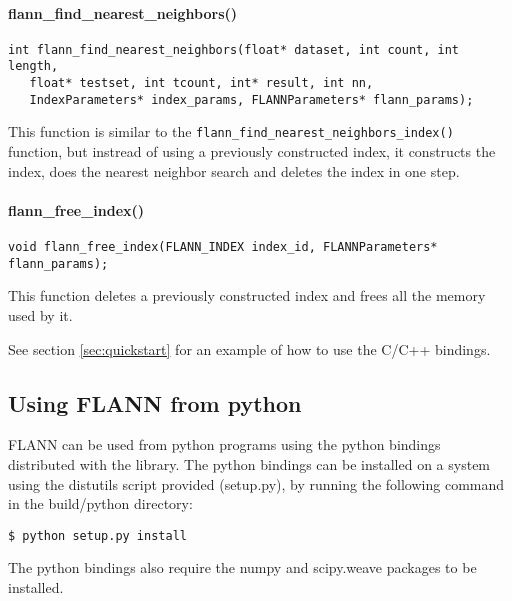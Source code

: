 \documentclass[letter,10pt]{article}
\begin{document}
\paragraph{flann\_find\_nearest\_neighbors()}
\begin{Verbatim}[fontsize=\footnotesize,frame=single]
int flann_find_nearest_neighbors(float* dataset, int count, int length,
   float* testset, int tcount, int* result, int nn, 
   IndexParameters* index_params, FLANNParameters* flann_params);
\end{Verbatim}
This function is similar to the
\texttt{flann\_find\_nearest\_neighbors\_index()} function, but instread of
using a previously constructed index, it constructs the index, does the nearest
neighbor search and deletes the index in one step.




\paragraph{flann\_free\_index()}
\begin{Verbatim}[fontsize=\footnotesize,frame=single]
void flann_free_index(FLANN_INDEX index_id, FLANNParameters* flann_params);
\end{Verbatim}
This function deletes a previously constructed index and frees all the memory
used by it.

\bigskip

See section \ref{sec:quickstart} for an example of how to use the C/C++
bindings.

\subsection{Using FLANN from python}

FLANN can be used from python programs using the python bindings distributed
with the library. The python bindings can be installed on a system using the
distutils script provided (setup.py), by running the following command in the
build/python directory:
\begin{Verbatim}[fontsize=\footnotesize,frame=single]
$ python setup.py install
\end{Verbatim}
The python bindings also require the numpy and scipy.weave packages to be
installed.
\end{document}
